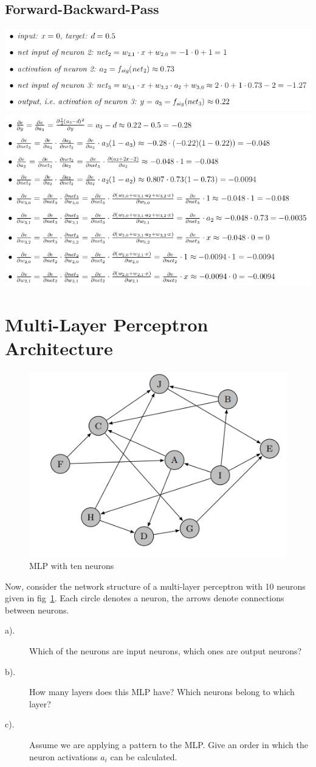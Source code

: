 \documentclass[12pt]{article}
\begin{document}
\subsection{Forward-Backward-Pass}

{
	\centering
	\includegraphics[width=.9\textwidth]{fig/2018-04-02-14-48-39.png} \\
	\includegraphics[width=.9\textwidth]{fig/2018-04-02-14-49-31.png}
}

\section{Multi-Layer Perceptron Architecture}

\begin{figure}[!htbp]
	\centering
	\includegraphics[width=.55\textwidth]{fig/2018-03-19-13-54-31.png}
	\caption{MLP with ten neurons} \label{fig:mlp2}
\end{figure}

Now, consider the network structure of a multi-layer perceptron with 10 neurons given in
fig~\ref{fig:mlp2}. Each circle denotes a neuron, the arrows denote connections between neurons.
\begin{description}
	\item[a).]  Which of the neurons are input neurons, which ones are output neurons?
	\item[b).] How many layers does this MLP have? Which neurons belong to which layer?
	\item[c).] Assume we are applying a pattern to the MLP. Give an order in which the neuron
	      activations $a_i$ can be calculated.
\end{description}
\end{document}
